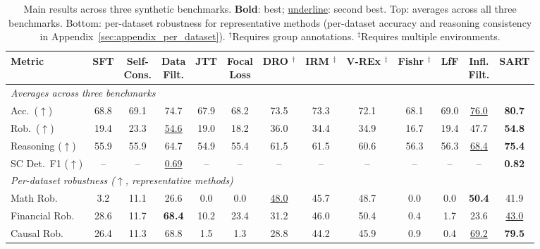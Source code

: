 \begin{table}[t]
\centering
\caption{Main results across three synthetic benchmarks. \textbf{Bold}: best; \underline{underline}: second best. Top: averages across all three benchmarks. Bottom: per-dataset robustness for representative methods (per-dataset accuracy and reasoning consistency in Appendix~\ref{sec:appendix_per_dataset}). $^\dagger$Requires group annotations. $^\ddagger$Requires multiple environments.}
\label{tab:main_results}
\footnotesize
\setlength{\tabcolsep}{4pt}
\begin{tabular}{lcccccccccccc}
\toprule
\textbf{Metric} & SFT & \makecell{Self-\\Cons.} & \makecell{Data\\Filt.} & JTT & \makecell{Focal\\Loss} & \makecell{DRO\\$^\dagger$} & \makecell{IRM\\$^\ddagger$} & \makecell{V-REx\\$^\ddagger$} & \makecell{Fishr\\$^\ddagger$} & LfF & \makecell{Infl.\\Filt.} & \textbf{SART} \\
\midrule
\multicolumn{13}{l}{\emph{Averages across three benchmarks}} \\
Acc.\ ($\uparrow$)       & 68.8 & 69.1 & 74.7 & 67.9 & 68.2 & 73.5 & 73.3 & 72.1 & 68.1 & 69.0 & \underline{76.0} & \textbf{80.7} \\
Rob.\ ($\uparrow$)       & 19.4 & 23.3 & \underline{54.6} & 19.0 & 18.2 & 36.0 & 34.4 & 34.9 & 16.7 & 19.4 & 47.7 & \textbf{54.8} \\
Reasoning ($\uparrow$)   & 55.9 & 55.9 & 64.7 & 54.9 & 55.4 & 61.5 & 61.5 & 60.6 & 56.3 & 56.3 & \underline{68.4} & \textbf{75.4} \\
SC Det.\ F1 ($\uparrow$) & --   & --   & \underline{0.69} & --   & --   & --   & --   & --   & --   & --   & --   & \textbf{0.82} \\
\midrule
\multicolumn{13}{l}{\emph{Per-dataset robustness ($\uparrow$, representative methods)}} \\
Math Rob.        & 3.2  & 11.1 & 26.6 & 0.0  & 0.0  & \underline{48.0} & 45.7 & 48.7 & 0.0  & 0.0  & \textbf{50.4} & 41.9 \\
Financial Rob.   & 28.6 & 11.7 & \textbf{68.4} & 10.2 & 23.4 & 31.2 & 46.0 & 50.4 & 0.4  & 1.7  & 23.6 & \underline{43.0} \\
Causal Rob.      & 26.4 & 11.3 & 68.8 & 1.5  & 1.3  & 28.8 & 44.2 & 45.9 & 0.9  & 0.4  & \underline{69.2} & \textbf{79.5} \\
\bottomrule
\end{tabular}
\end{table}

